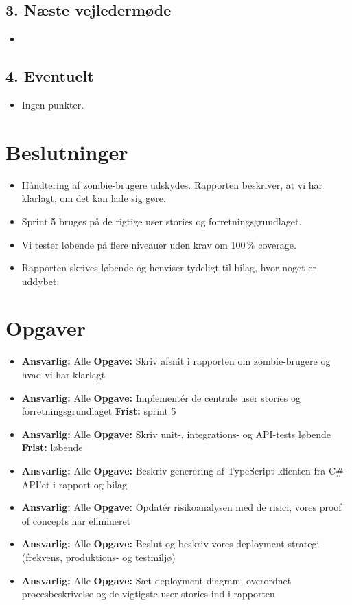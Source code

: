 \documentclass[a4paper,11pt]{article}
\begin{document}
\subsection*{3. Næste vejledermøde}

\begin{itemize}
    \item
\end{itemize}

\subsection*{4. Eventuelt}

\begin{itemize}
    \item Ingen punkter.
\end{itemize}

\section*{Beslutninger}

\begin{itemize}
    \item Håndtering af zombie-brugere udskydes. Rapporten beskriver, at vi har klarlagt, om det kan lade sig gøre.
    \item Sprint 5 bruges på de rigtige user stories og forretningsgrundlaget.
    \item Vi tester løbende på flere niveauer uden krav om 100\,\% coverage.
    \item Rapporten skrives løbende og henviser tydeligt til bilag, hvor noget er uddybet.
\end{itemize}

\section*{Opgaver}

\begin{itemize}
    \item \textbf{Ansvarlig:} Alle \textbf{Opgave:} Skriv afsnit i rapporten om zombie-brugere og hvad vi har klarlagt
    \item \textbf{Ansvarlig:} Alle \textbf{Opgave:} Implementér de centrale user stories og forretningsgrundlaget \textbf{Frist:} sprint 5
    \item \textbf{Ansvarlig:} Alle \textbf{Opgave:} Skriv unit-, integrations- og API-tests løbende \textbf{Frist:} løbende
    \item \textbf{Ansvarlig:} Alle \textbf{Opgave:} Beskriv generering af TypeScript-klienten fra C\#-API'et i rapport og bilag
    \item \textbf{Ansvarlig:} Alle \textbf{Opgave:} Opdatér risikoanalysen med de risici, vores proof of concepts har elimineret
    \item \textbf{Ansvarlig:} Alle \textbf{Opgave:} Beslut og beskriv vores deployment-strategi (frekvens, produktions- og testmiljø)
    \item \textbf{Ansvarlig:} Alle \textbf{Opgave:} Sæt deployment-diagram, overordnet procesbeskrivelse og de vigtigste user stories ind i rapporten
\end{itemize}
\end{document}
